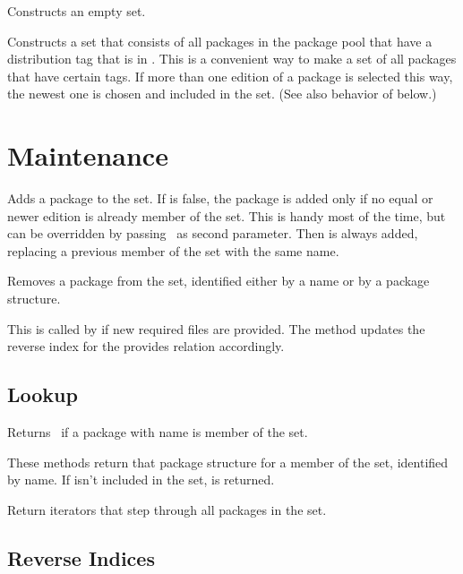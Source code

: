\documentclass[10pt]{article}
\begin{document}
Constructs an empty set.

Constructs a set that consists of all packages in the package pool
that have a distribution tag that is in . This is a
convenient way to make a set of all packages that have certain tags.
If more than one edition of a package is selected this way, the newest
one is chosen and included in the set. (See also behavior of
 below.)

\section{Maintenance}

Adds a package to the set. If  is false, the package is
added only if no equal or newer edition is already member of the set.
This is handy most of the time, but can be overridden by passing
\true\ as second parameter. Then  is always added,
replacing a previous member of the set with the same name.

Removes a package from the set, identified either by a name or by a
package structure.

This is called by  if new required files are provided.
The method updates the reverse index for the provides relation accordingly.

\subsection{Lookup}

Returns \true\ if a package with name  is member of the set.

These methods return that package structure for a member of the set,
identified by name. If  isn't included in the set,
 is returned.

Return iterators that step through all packages in the set.

\subsection{Reverse Indices}
\end{document}
